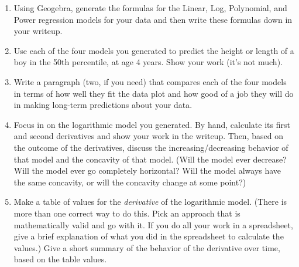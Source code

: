 \documentclass[11pt,letterpaper]{article}
\begin{document}
\begin{enumerate}
	\item Using Geogebra, generate the formulas for the Linear, Log, Polynomial, and Power regression models for your data and then write these formulas down in your writeup. 

	\item Use each of the four models you generated to predict the height or length of a boy in the 50th percentile, at age 4 years. Show your work (it's not much). 

	\item Write a paragraph (two, if you need) that compares each of the four models in terms of how well they fit the data plot and how good of a job they will do in making long-term predictions about your data. 

	\item Focus in on the logarithmic model you generated. By hand, calculate its first and second derivatives and show your work in the writeup. Then, based on the outcome of the derivatives, discuss the increasing/decreasing behavior of that model and the concavity of that model. (Will the model ever decrease? Will the model ever go completely horizontal? Will the model always have the same concavity, or will the concavity change at some point?) 

	\item Make a table of values for the \emph{derivative} of the logarithmic model. (There is more than one correct way to do this. Pick an approach that is mathematically valid and go with it. If you do all your work in a spreadsheet, give a brief explanation of what you did in the spreadsheet to calculate the values.) Give a short summary of the behavior of the derivative over time, based on the table values. 

\end{enumerate}

	
\end{document}
